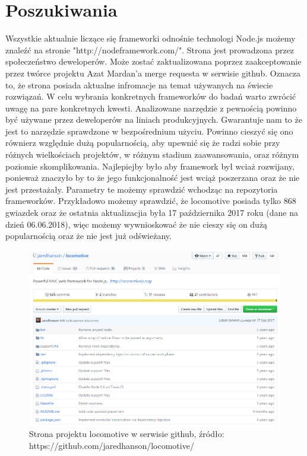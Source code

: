 \documentclass[12pt]{report}
\begin{document}
  \section{Poszukiwania}
    Wszystkie aktualnie liczące się frameworki odnośnie technologi Node.js możemy znaleźć na stronie "http://nodeframework.com/".
    Strona jest prowadzona przez społeczeństwo deweloperów.
    Może zostać zaktualizowana poprzez zaakceptowanie przez twórce projektu Azat Mardan'a merge requesta w serwisie github.
    Oznacza to, że strona posiada aktualne infromacje na temat używanych na świecie rozwiązań.
    W celu wybrania konkretnych frameworków do badań warto zwrócić uwagę na pare konkretnych kwesti.
    Analizowane narzędzie z pewnością powinno być używane przez deweloperów na liniach produkcyjnych.
    Gwarantuje nam to że jest to narzędzie sprawdzone w bezpośrednium użyciu.
    Powinno cieszyć się ono równierz względnie dużą popularnością, aby upewnić się że radzi sobie przy różnych wielkościach projektów, w różnym stadium zaawansowania, oraz różnym poziomie skomplikowania.
    Najlepiejby było aby framework był wciaż rozwijany, ponieważ znaczyło by to że jego funkcjonalność jest wciąż poszerzana oraz że nie jest przestażały.
    Parametry te możemy sprawdzić wchodząc na repozytoria frameworków.
    Przykładowo możemy sprawdzić, że locomotive posiada tylko 868 gwiazdek oraz że ostatnia aktualizacjia była 17 października 2017 roku (dane na dzień 06.06.2018), więc możemy wywnioskować że nie cieszy się on dużą popularnością oraz że nie jest już odświeżany.
    \begin{figure}[!hb]
      \centering
      \includegraphics[width=\textwidth,height=\textheight,keepaspectratio]{locomotive.png} 
      \caption{Strona projektu locomotive w serwisie github, źródło: https://github.com/jaredhanson/locomotive/}
    \end{figure}
\end{document}
